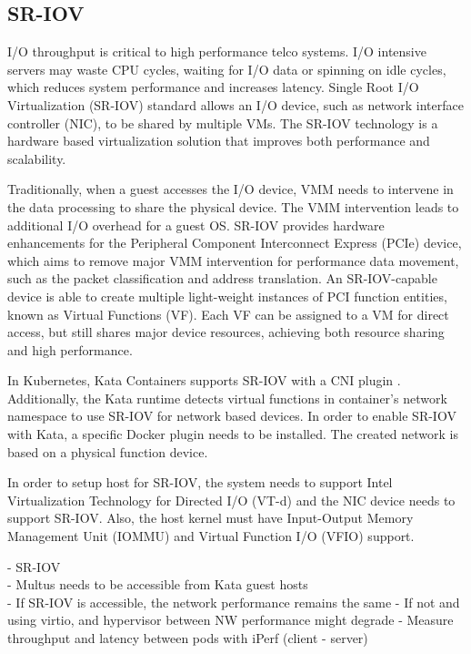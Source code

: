 \subsection{SR-IOV}
\label{section:SR-IOV}

I/O throughput is critical to high performance telco systems. I/O intensive servers may waste CPU cycles, waiting for I/O data or spinning on idle cycles, which reduces system performance and increases latency. Single Root I/O Virtualization (SR-IOV) standard allows an I/O device, such as network interface controller (NIC), to be shared by multiple VMs. The SR-IOV technology is a hardware based virtualization solution that improves both performance and scalability. \cite{Dong2012}

Traditionally, when a guest accesses the I/O device, VMM needs to intervene in the data processing to share the physical device. The VMM intervention leads to additional I/O overhead for a guest OS. SR-IOV provides hardware enhancements for the Peripheral Component Interconnect Express (PCIe) device, which aims to remove major VMM intervention for performance data movement, such as the packet classification and address translation. An SR-IOV-capable device is able to create multiple light-weight instances of PCI function entities, known as Virtual Functions (VF). Each VF can be assigned to a VM for direct access, but still shares major device resources, achieving both resource sharing and high performance. \cite{Dong2012}

In Kubernetes, Kata Containers supports SR-IOV with a CNI plugin \cite{SR-IOVOpenShift}. Additionally, the Kata runtime detects virtual functions in container's network namespace to use SR-IOV for network based devices. In order to enable SR-IOV with Kata, a specific Docker plugin needs to be installed. The created network is based on a physical function device. \cite{SR-IOVKataContainers}

In order to setup host for SR-IOV, the system needs to support Intel Virtualization Technology for Directed I/O (VT-d) and the NIC device needs to support SR-IOV. Also, the host kernel must have Input-Output Memory Management Unit (IOMMU) and Virtual Function I/O (VFIO) support.

- SR-IOV \\
	- Multus needs to be accessible from Kata guest hosts \\
	
- If SR-IOV is accessible, the network performance remains the same
	- If not and using virtio, and hypervisor between NW performance might degrade
		- Measure throughput and latency between pods with iPerf (client - server)

